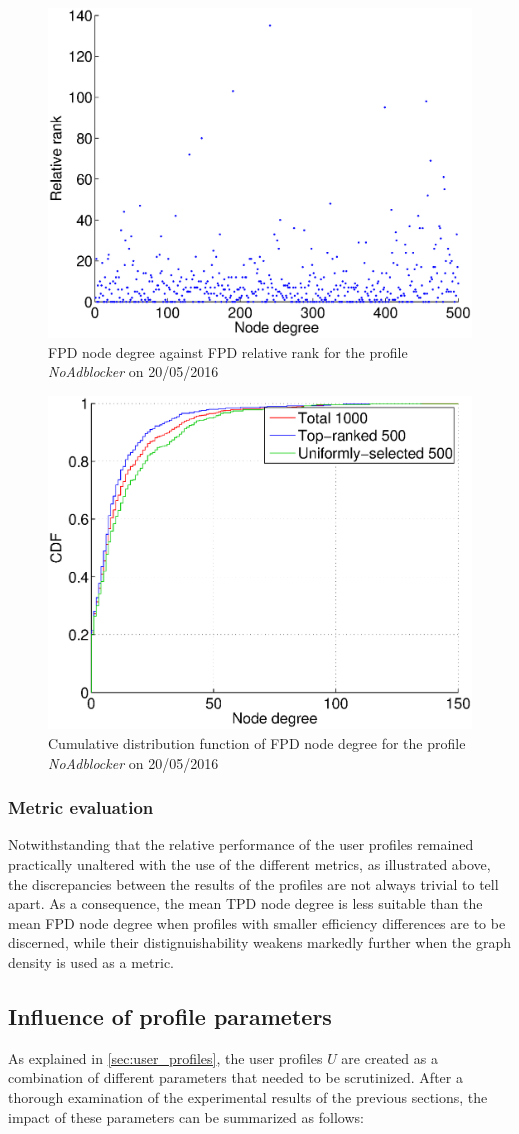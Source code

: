 \documentclass{sig-alternate}
\begin{document}
  \begin{figure}
 \centering
 \includegraphics[width=.45\textwidth]{figures/plots/scatterplot.eps}
 \caption{FPD node degree against FPD relative rank for the profile \textit{NoAdblocker} on 20/05/2016}
 \label{fig:first_party_degree_relative_rank}
\end{figure}

\begin{figure}
 \centering
 \includegraphics[width=.45\textwidth]{figures/plots/cdf-first-node-degree.eps}
 \caption{Cumulative distribution function of FPD node degree for the profile \textit{NoAdblocker} on 20/05/2016}
 \label{fig:cdf_first_node_degree}
\end{figure}

\subsubsection{Metric evaluation}
Notwithstanding that the relative performance of the user profiles remained practically unaltered with the use of the different metrics, as illustrated above, the discrepancies between the results of the profiles are not always trivial to tell apart. As a consequence, the mean TPD node degree is less suitable than the mean FPD node degree when profiles with smaller efficiency differences are to be discerned, while their distignuishability weakens markedly further when the graph density is used as a metric.


\subsection{Influence of profile parameters}
As explained in \ref{sec:user_profiles}, the user profiles $U$ are created as a combination of different parameters that needed to be scrutinized. After a thorough examination of the experimental results of the previous sections, the impact of these parameters can be summarized as follows:
\end{document}

